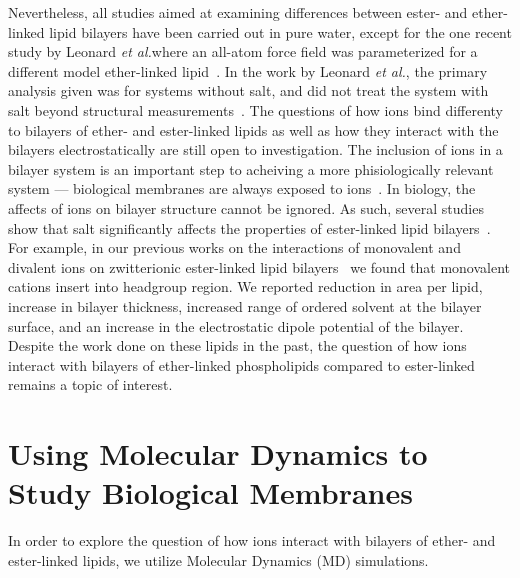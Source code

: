 \documentclass[12pt,openany,final]{book}
\newcommand{\etal}{\textit{et al.}}
\begin{document}
Nevertheless, all studies aimed at examining differences between ester- and ether-linked lipid bilayers have been carried out in pure water, except for the one recent study by 
Leonard \etal where an all-atom force field was parameterized for a different model ether-linked lipid~\cite{leonard:2018}. In the work by Leonard \etal, the primary analysis
given was for systems without salt, and did not treat the system with salt beyond structural measurements~\cite{leonard:2018}. The questions of how ions bind differenty to 
bilayers of ether- and ester-linked lipids as well as how they interact with the bilayers electrostatically are still open to investigation. The inclusion of
ions in a bilayer system is an important step to acheiving a more phisiologically relevant system --- biological membranes are always exposed to ions~\cite{reece:2014:biobook}. 
In biology, the affects of ions on bilayer structure cannot be ignored.
As such, several studies show that salt significantly 
affects the properties of ester-linked lipid bilayers~\cite{kruczek:2019,kruczek:2017,duro:2016,pabst:2007,sachs:2004,petrache:2006:swelling,leonard:2018}. 
For example, in our previous works on the interactions of monovalent and divalent ions on zwitterionic ester-linked lipid bilayers~\cite{kruczek:2019,kruczek:2017}
we found that monovalent cations insert into headgroup region. 
We reported reduction in area per lipid, increase in  bilayer thickness, increased range of ordered solvent at the bilayer surface, and an increase in
the electrostatic dipole potential of the bilayer.
Despite the work done on these lipids in the past, the question of how ions interact with bilayers of ether-linked
phospholipids compared to ester-linked remains a topic of interest.



\section{Using Molecular Dynamics to Study Biological Membranes}
In order to explore the question of how ions interact with bilayers of ether- and ester-linked lipids, we utilize 
Molecular Dynamics (MD) simulations.
\end{document}
